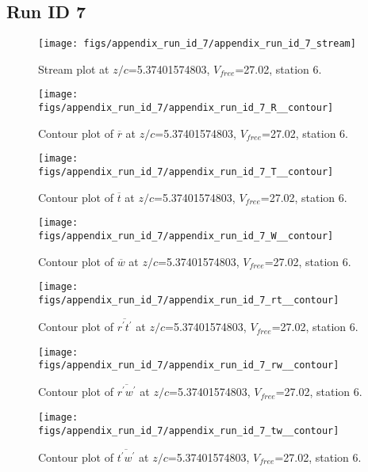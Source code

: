 \subsection{Run ID 7}
\begin{figure}[H]
\centering
\texttt{[image: figs/appendix\_run\_id\_7/appendix\_run\_id\_7\_stream]}
\caption{Stream plot at $z/c$=5.37401574803, $V_{free}$=27.02, station 6.}
\label{fig:appendix_run_id_7_stream}
\end{figure}


\begin{figure}[H]
\centering
\texttt{[image: figs/appendix\_run\_id\_7/appendix\_run\_id\_7\_R\_\_contour]}
\caption{Contour plot of $\overline{r}$ at $z/c$=5.37401574803, $V_{free}$=27.02, station 6.}
\label{fig:appendix_run_id_7_R__contour}
\end{figure}


\begin{figure}[H]
\centering
\texttt{[image: figs/appendix\_run\_id\_7/appendix\_run\_id\_7\_T\_\_contour]}
\caption{Contour plot of $\overline{t}$ at $z/c$=5.37401574803, $V_{free}$=27.02, station 6.}
\label{fig:appendix_run_id_7_T__contour}
\end{figure}


\begin{figure}[H]
\centering
\texttt{[image: figs/appendix\_run\_id\_7/appendix\_run\_id\_7\_W\_\_contour]}
\caption{Contour plot of $\overline{w}$ at $z/c$=5.37401574803, $V_{free}$=27.02, station 6.}
\label{fig:appendix_run_id_7_W__contour}
\end{figure}


\begin{figure}[H]
\centering
\texttt{[image: figs/appendix\_run\_id\_7/appendix\_run\_id\_7\_rt\_\_contour]}
\caption{Contour plot of $\overline{r^\prime t^\prime}$ at $z/c$=5.37401574803, $V_{free}$=27.02, station 6.}
\label{fig:appendix_run_id_7_rt__contour}
\end{figure}


\begin{figure}[H]
\centering
\texttt{[image: figs/appendix\_run\_id\_7/appendix\_run\_id\_7\_rw\_\_contour]}
\caption{Contour plot of $\overline{r^\prime w^\prime}$ at $z/c$=5.37401574803, $V_{free}$=27.02, station 6.}
\label{fig:appendix_run_id_7_rw__contour}
\end{figure}


\begin{figure}[H]
\centering
\texttt{[image: figs/appendix\_run\_id\_7/appendix\_run\_id\_7\_tw\_\_contour]}
\caption{Contour plot of $\overline{t^\prime w^\prime}$ at $z/c$=5.37401574803, $V_{free}$=27.02, station 6.}
\label{fig:appendix_run_id_7_tw__contour}
\end{figure}


